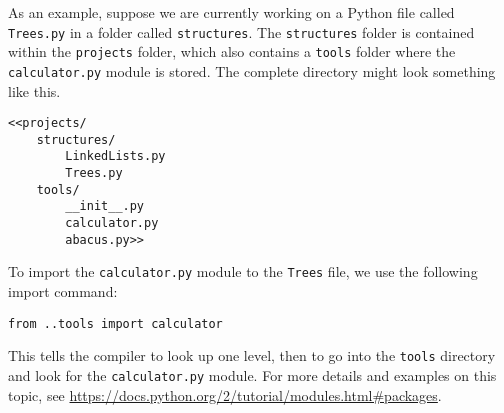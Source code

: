 As an example, suppose we are currently working on a Python file called \texttt{Trees.py} in a folder called \texttt{structures}.
The \texttt{structures} folder is contained within the \texttt{projects} folder, which also contains a \texttt{tools} folder where the \texttt{calculator.py} module is stored.
The complete directory might look something like this.

\begin{lstlisting}
<<projects/
    structures/
        LinkedLists.py
        Trees.py
    tools/
        __init__.py
        calculator.py
        abacus.py>>
\end{lstlisting}

To import the \texttt{calculator.py} module to the \texttt{Trees} file, we use the following import command:

\begin{lstlisting}
from ..tools import calculator
\end{lstlisting}

This tells the compiler to look up one level, then to go into the \texttt{tools} directory and look for the \texttt{calculator.py} module.
For more details and examples on this topic, see \url{https://docs.python.org/2/tutorial/modules.html\#packages}.

